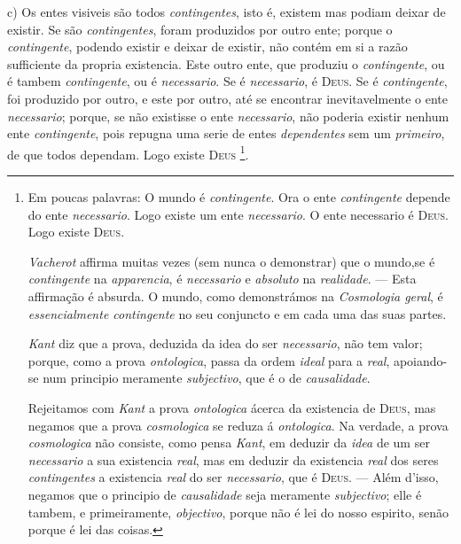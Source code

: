 c) Os entes visiveis são todos \emph{contingentes}, isto é, existem mas podiam deixar de existir. Se são \emph{contingentes}, foram produzidos por outro ente; porque o \emph{contingente}, podendo existir e deixar de existir, não contém em si a razão sufficiente da propria existencia. Este outro ente, que produziu o \emph{contingente}, ou é tambem \emph{contingente}, ou é \emph{necessario}. Se é \emph{necessario}, é \textsc{Deus}. Se é \emph{contingente}, foi produzido por outro, e este por outro, até se encontrar inevitavelmente o ente \emph{necessario}; porque, se não existisse o ente \emph{necessario}, não poderia existir nenhum ente \emph{contingente}, pois repugna uma serie de entes \emph{dependentes} sem um \emph{primeiro}, de que todos dependam. Logo existe \textsc{Deus} \footnote{Em poucas palavras: O mundo é \emph{contingente}. Ora o ente \emph{contingente} depende do ente \emph{necessario}. Logo existe um ente \emph{necessario}. O ente necessario é \textsc{Deus}. Logo existe \textsc{Deus}.\par \emph{Vacherot} affirma muitas vezes (sem nunca o demonstrar) que o mundo,se é \emph{contingente} na \emph{apparencia}, é \emph{necessario} e \emph{absoluto} na \emph{realidade}. --- Esta affirmação é absurda. O mundo, como demonstrámos na \emph{Cosmologia geral}, é \emph{essencialmente contingente} no seu conjuncto e em cada uma das suas partes.\par \emph{Kant} diz que a prova, deduzida da idea do ser \emph{necessario}, não tem valor; porque, como a prova \emph{ontologica}, passa da ordem \emph{ideal} para a \emph{real}, apoiando-se num principio meramente \emph{subjectivo}, que é o de \emph{causalidade}.\par Rejeitamos com \emph{Kant} a prova \emph{ontologica} ácerca da existencia de \textsc{Deus}, mas negamos que a prova \emph{cosmologica} se reduza á \emph{ontologica}. Na verdade, a prova \emph{cosmologica} não consiste, como pensa \emph{Kant}, em deduzir da \emph{idea} de um ser \emph{necessario} a sua existencia \emph{real}, mas em deduzir da existencia \emph{real} dos seres \emph{contingentes} a existencia \emph{real} do ser \emph{necessario}, que é \textsc{Deus}. --- Além d'isso, negamos que o principio de \emph{causalidade} seja meramente \emph{subjectivo}; elle é tambem, e primeiramente, \emph{objectivo}, porque não é lei do nosso espirito, senão porque é lei das coisas.}.
